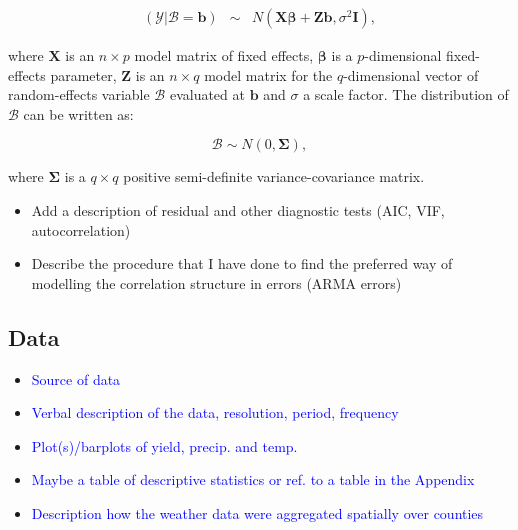 \documentclass[a4paper,12pt]{article}
\begin{document}
\begin{equation}\label{MixedGeneral}
\begin{array}{lcl}

(\mathscr{Y}|\mathscr{B}=\mathbf{b})& \sim & \mathit{N}(\mathbf{X}\mathbf{\beta}+\mathbf{Z}\mathbf{b},\sigma^2\mathbf{I}),

\end{array}
\end{equation}

where $\mathbf{X}$ is an $n \times p$ model matrix of fixed effects, $\mathbf{\beta}$ is a $p$-dimensional fixed-effects parameter, $\mathbf{Z}$ is an $n \times q$ model matrix for the $q$-dimensional vector of random-effects variable $\mathscr{B}$ evaluated at $\mathbf{b}$ and $\sigma$ a scale factor. The distribution of $\mathscr{B}$ can be written as: 

\begin{equation}\label{ranefDist}
\mathscr{B} \sim \mathit{N}(0,\mathbf{\Sigma}),
\end{equation}

where $\mathbf{\Sigma}$ is a $q \times q$ positive semi-definite variance-covariance matrix.

\color{blue}
\begin{itemize}
\item Add a description of residual and other diagnostic tests (AIC, VIF, autocorrelation)
\item Describe the procedure that I have done to find the preferred way of modelling the  correlation structure in errors (ARMA errors)
\end{itemize}
\color{black}
\FloatBarrier

\subsection{Data}
\begin{itemize}
\item \textcolor{blue}{Source of data}
\item \textcolor{blue} {Verbal description of the data, resolution, period, frequency}
\item \textcolor{blue} {Plot(s)/barplots of yield, precip. and temp.}
\item \textcolor{blue}{Maybe a table of descriptive statistics or ref. to a table in the Appendix}
\item \textcolor{blue}{Description how the weather data were aggregated spatially over counties}
\end{itemize}
\end{document}
